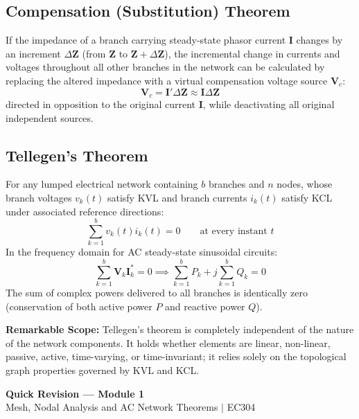 \documentclass[12pt,a4paper]{article}
\begin{document}
\subsection{Compensation (Substitution) Theorem}
If the impedance of a branch carrying steady-state phasor current $\mathbf{I}$ changes by an increment $\Delta\mathbf{Z}$ (from $\mathbf{Z}$ to $\mathbf{Z} + \Delta\mathbf{Z}$), the incremental change in currents and voltages throughout all other branches in the network can be calculated by replacing the altered impedance with a virtual compensation voltage source $\mathbf{V}_c$:
\begin{equation}
  \mathbf{V}_c = \mathbf{I}' \Delta\mathbf{Z} \approx \mathbf{I} \Delta\mathbf{Z}
\end{equation}
directed in opposition to the original current $\mathbf{I}$, while deactivating all original independent sources.

\subsection{Tellegen's Theorem}

\begin{tcolorbox}[defbox, title={\textbf{Tellegen's Theorem}}]
For any lumped electrical network containing $b$ branches and $n$ nodes, whose branch voltages $v_k(t)$ satisfy KVL and branch currents $i_k(t)$ satisfy KCL under associated reference directions:
\begin{equation}
  \sum_{k=1}^b v_k(t) i_k(t) = 0 \qquad \text{at every instant } t
\end{equation}
In the frequency domain for AC steady-state sinusoidal circuits:
\begin{equation}
  \sum_{k=1}^b \mathbf{V}_k \mathbf{I}_k^* = 0 \implies \sum_{k=1}^b P_k + j \sum_{k=1}^b Q_k = 0
\end{equation}
The sum of complex powers delivered to all branches is identically zero (conservation of both active power $P$ and reactive power $Q$).
\end{tcolorbox}

\textbf{Remarkable Scope:} Tellegen's theorem is completely independent of the nature of the network components. It holds whether elements are linear, non-linear, passive, active, time-varying, or time-invariant; it relies solely on the topological graph properties governed by KVL and KCL.

\newpage
\begin{center}
  {\large\bfseries\color{myred} Quick Revision --- Module 1}\\[3pt]
  {\small\color{mydark} Mesh, Nodal Analysis and AC Network Theorems $|$ EC304}
\end{center}
\noindent{\color{myred}\rule{\linewidth}{1.2pt}}
\vspace{4pt}
\end{document}
